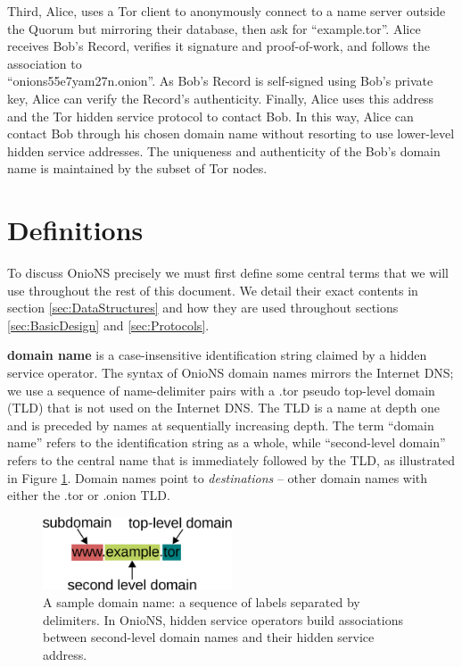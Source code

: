 Third, Alice, uses a Tor client to anonymously connect to a name server outside the Quorum but mirroring their database, then ask for ``example.tor''. Alice receives Bob's Record, verifies it signature and proof-of-work, and follows the association to \\ ``onions55e7yam27n.onion''. As Bob's Record is self-signed using Bob's private key, Alice can verify the Record's authenticity. Finally, Alice uses this address and the Tor hidden service protocol to contact Bob. In this way, Alice can contact Bob through his chosen domain name without resorting to use lower-level hidden service addresses. The uniqueness and authenticity of the Bob's domain name is maintained by the subset of Tor nodes.

\section{Definitions}

To discuss OnioNS precisely we must first define some central terms that we will use throughout the rest of this document. We detail their exact contents in section \ref{sec:DataStructures} and how they are used throughout sections \ref{sec:BasicDesign} and \ref{sec:Protocols}.

\textbf{domain name} is a case-insensitive identification string claimed by a hidden service operator. The syntax of OnioNS domain names mirrors the Internet DNS; we use a sequence of name-delimiter pairs with a .tor pseudo top-level domain (TLD) that is not used on the Internet DNS. The TLD is a name at depth one and is preceded by names at sequentially increasing depth. The term ``domain name'' refers to the identification string as a whole, while ``second-level domain'' refers to the central name that is immediately followed by the TLD, as illustrated in Figure \ref{fig:sampleDomain}. Domain names point to \emph{destinations} -- other domain names with either the .tor or .onion TLD.

		\begin{figure}[htbp]
			\centering
			\includegraphics[width=0.5\textwidth]{images/domain-name.eps}
			\caption{A sample domain name: a sequence of labels separated by delimiters. In OnioNS, hidden service operators build associations between second-level domain names and their hidden service address.}
			\label{fig:sampleDomain}
		\end{figure}

